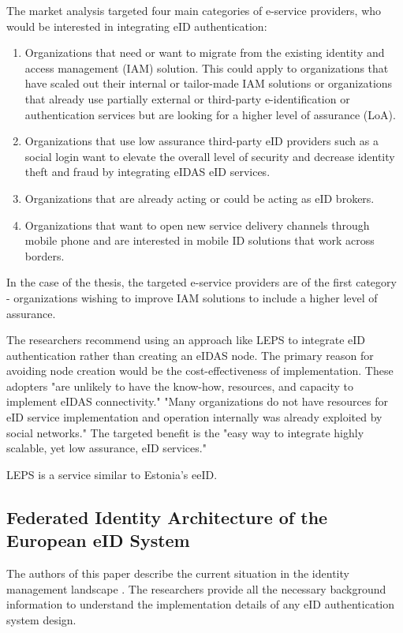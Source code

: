 The market analysis targeted four main categories of e-service providers, who would be interested in integrating eID authentication:

\begin{enumerate}
    \item Organizations that need or want to migrate from the existing identity and access management (IAM) solution. This could apply to organizations that have scaled out their internal or tailor-made IAM solutions or organizations that already use partially external or third-party e-identification or authentication services but are looking for a higher level of assurance (LoA).
    \item Organizations that use low assurance third-party eID providers such as a social login want to elevate the overall level of security and decrease identity theft and fraud by integrating eIDAS eID services.
    \item Organizations that are already acting or could be acting as eID brokers.
    \item Organizations that want to open new service delivery channels through mobile phone and are interested in mobile ID solutions that work across borders.
\end{enumerate}

In the case of the thesis, the targeted e-service providers are of the first category - organizations wishing to improve IAM solutions to include a higher level of assurance.

The researchers recommend using an approach like LEPS to integrate eID authentication rather than creating an eIDAS node. The primary reason for avoiding node creation would be the cost-effectiveness of implementation. These adopters "are unlikely to have the know-how, resources, and capacity to implement eIDAS connectivity." "Many organizations do not have resources for eID service implementation and operation internally was already exploited by social networks." The targeted benefit is the "easy way to integrate highly scalable, yet low assurance, eID services."

LEPS is a service similar to Estonia's eeID.

\subsection{Federated Identity Architecture of the European eID System}

The authors of this paper describe the current situation in the identity management landscape \cite{federated-europe-identity}. The researchers provide all the necessary background information to understand the implementation details of any eID authentication system design.

